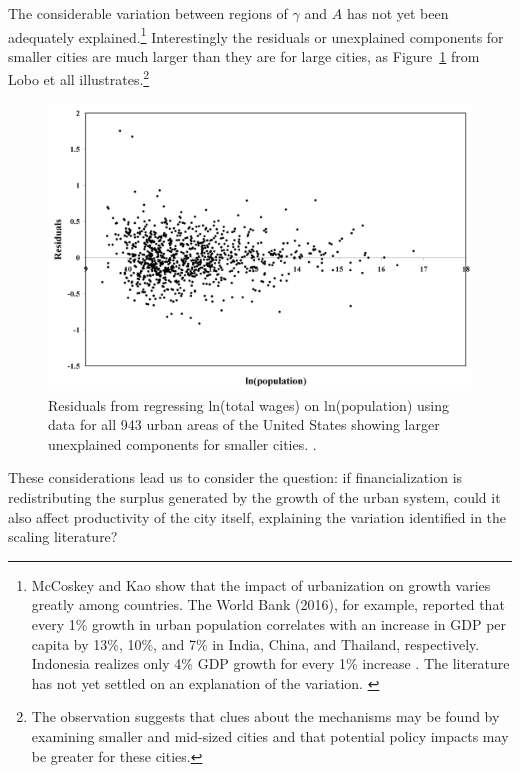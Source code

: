 The considerable variation between regions of $\gamma$ and $A$ \cite{mccoskeyPanelDataInvestigation, haryantotriRelationshipUrbanizationEducation2021, pugaMagnitudeCausesAgglomeration2010, loboUrbanScalingProduction2013} has not yet been adequately explained.\footnote{McCoskey and Kao \cite{mccoskeyPanelDataInvestigation} show that the impact of urbanization on growth varies greatly among countries. The World Bank (2016), for example, reported that every 1\% growth in urban population correlates with an increase in GDP per capita by 13\%, 10\%, and 7\% in India, China, and Thailand, respectively. Indonesia realizes only 4\% GDP growth for every 1\% increase \cite{haryantotriRelationshipUrbanizationEducation2021}.  The literature has not yet settled on an explanation of the variation.  \cite{loboUrbanScalingProduction2013, pugaMagnitudeCausesAgglomeration2010}} 
Interestingly the residuals or unexplained components for smaller cities are much larger than they are for large cities, as Figure~\ref{fig-residuals-lobo} from Lobo et all \cite{loboUrbanScalingProduction2013} illustrates.\footnote{The observation suggests that clues about the mechanisms may be found by examining smaller and mid-sized cities and that potential policy impacts may be greater for these cities.} 
\begin{figure}[h!tb]
\centering
\includegraphics[scale=0.30]{fig/residuals-lobo.png}
\caption{Residuals from regressing ln(total wages) on ln(population) using data for all 943 urban areas of the United States showing larger unexplained components for smaller cities. \cite{loboUrbanScalingProduction2013}.}\label{fig-residuals-lobo}
\end{figure} 
These considerations lead us to consider the question: if financialization is redistributing the surplus generated by the growth of the urban system, could it also affect  productivity of the city itself, explaining the variation identified in the scaling literature? 



